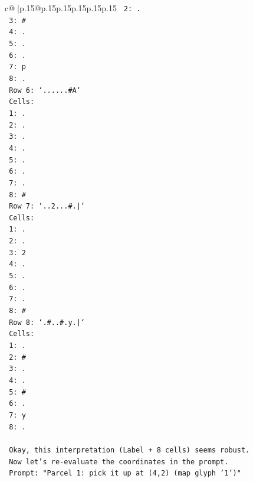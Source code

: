 \documentclass{article}
\begin{document}
{\begin{supertabular}{c@{$\;$}|p{.15\linewidth}@{}p{.15\linewidth}p{.15\linewidth}p{.15\linewidth}p{.15\linewidth}p{.15\linewidth}}
{{{\texttt{   2: .} \\
\texttt{   3: \#} \\
\texttt{   4: .} \\
\texttt{   5: .} \\
\texttt{   6: .} \\
\texttt{   7: p} \\
\texttt{   8: .} \\
\texttt{   Row 6: `......\#A`} \\
\texttt{   Cells:} \\
\texttt{   1: .} \\
\texttt{   2: .} \\
\texttt{   3: .} \\
\texttt{   4: .} \\
\texttt{   5: .} \\
\texttt{   6: .} \\
\texttt{   7: .} \\
\texttt{   8: \#} \\
\texttt{   Row 7: `..2...\#.|`} \\
\texttt{   Cells:} \\
\texttt{   1: .} \\
\texttt{   2: .} \\
\texttt{   3: 2} \\
\texttt{   4: .} \\
\texttt{   5: .} \\
\texttt{   6: .} \\
\texttt{   7: .} \\
\texttt{   8: \#} \\
\texttt{   Row 8: `.\#..\#.y.|`} \\
\texttt{   Cells:} \\
\texttt{   1: .} \\
\texttt{   2: \#} \\
\texttt{   3: .} \\
\texttt{   4: .} \\
\texttt{   5: \#} \\
\texttt{   6: .} \\
\texttt{   7: y} \\
\texttt{   8: .} \\
\\ 
\texttt{   Okay, this interpretation (Label + 8 cells) seems robust.} \\
\texttt{   Now let's re{-}evaluate the coordinates in the prompt.} \\
\texttt{   Prompt: "Parcel 1: pick it up at (4,2) (map glyph '1')"} \\
}}}
\end{supertabular}}
\end{document}
